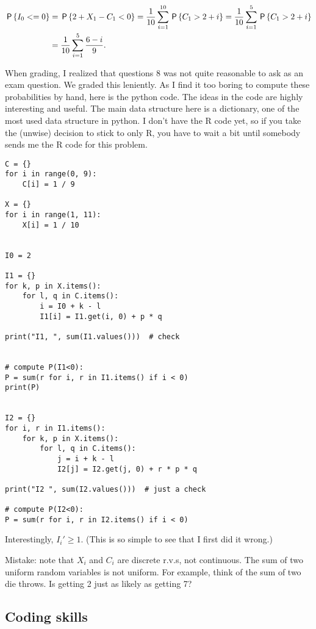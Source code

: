 \documentclass[assignments]{subfiles}
\begin{document}
\begin{exercise}
\begin{solution}
\begin{align}
  \label{}
\P{I_{0} < = 0} &= \P{2 + X_{1} - C_{1} < 0} = \frac{1}{10} \sum_{i=1}^{10} \P{C_{1} > 2 + i } = \frac{1}{10} \sum_{i=1}^{5} \P{C_{1} > 2 + i } \\
&= \frac{1}{10} \sum_{i=1}^{5} \frac{6-i}{9}.
\end{align}

When grading, I realized that questions 8 was not quite reasonable to ask as an exam question.
We graded this leniently.
As I find it too boring to compute these probabilities by hand, here is the python code.
The ideas in the code are highly interesting and useful.
The main data structure here is a dictionary, one of the most used data structure in python.
I don't have the R code yet, so if you take the (unwise) decision to stick to only R, you have to wait a bit until somebody sends me the R code for this problem.
\begin{verbatim}
C = {}
for i in range(0, 9):
    C[i] = 1 / 9

X = {}
for i in range(1, 11):
    X[i] = 1 / 10


I0 = 2

I1 = {}
for k, p in X.items():
    for l, q in C.items():
        i = I0 + k - l
        I1[i] = I1.get(i, 0) + p * q

print("I1, ", sum(I1.values()))  # check


# compute P(I1<0):
P = sum(r for i, r in I1.items() if i < 0)
print(P)


I2 = {}
for i, r in I1.items():
    for k, p in X.items():
        for l, q in C.items():
            j = i + k - l
            I2[j] = I2.get(j, 0) + r * p * q

print("I2 ", sum(I2.values()))  # just a check

# compute P(I2<0):
P = sum(r for i, r in I2.items() if i < 0)
\end{verbatim}

Interestingly, $I_{i}'\geq 1$. (This is so simple to see that I first did it wrong.)



Mistake: note that $X_{i}$   and $C_{i}$ are discrete r.v.s, not continuous.
The sum of two uniform random variables is not uniform. For example, think of the sum of two die throws. Is getting 2 just as likely as getting 7?
\end{solution}


\end{exercise}

\subsection{Coding skills}
\label{sec:coding-skills}
\end{document}
